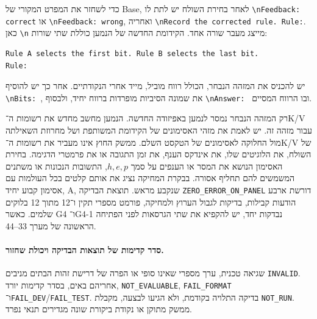 \documentclass[11pt,a4paper]{article}
\DeclareRobustCommand{\textenglish}[1]{\foreignlanguage{english}{#1}}
\newenvironment{english}{\begin{otherlanguage}{english}}{\end{otherlanguage}}
\theoremstyle{definition}
\begin{document}
כדי לשחזר את המפרט המקורי של \textenglish{Base}, לאחר בחירת השולח יש לתת לו \verb!\nFeedback: correct! או \verb!\nFeedback: wrong!, ואחריה \verb!\nRecord the corrected rule. Rule:!. כאן \verb!\n! מייצג מעבר שורה אחד. הקידומת החדשה של הנמען כוללת שתי שורות:
\begin{english}
\begin{verbatim}
Rule A selects the first bit. Rule B selects the last bit.
Rule:
\end{verbatim}
\end{english}
יש להכניס את המזהה הנבחר, הכולל רווח מוביל, מייד אחרי הנקודתיים. אחר כך יש להוסיף \verb!\nBits: !, את שמונה הסיביות מופרדות ברווח יחיד, ולבסוף \verb!\nAnswer: ! ובו הרווח המסיים.

רק המזהה הנבחר נמסר לנמען באפיזודה החדשה. הנמען מחשב מחדש את רשומות ה־\textenglish{K/V} עבור מזהה זה. יש לאמת את מזהי האסימונים של הקידומת המשותפת ושל מחרוזת השאילתה מול החלוקה לאסימונים של הטקסט השלם. ממשק החוץ אינו מעביר את רשומות ה־\textenglish{K/V} של השולח, את הלוגיטים שלו, את אינדקס הענף, את זמן התגובה או את פרמטרי הדגימה. בחירת האסימון הנושא את המסר או הענפים על סמך $h,e,p$, התשובות הנכונות או משתנים המשמשים להם תחליף אסורה. בבקרת המחיקה נציג את אותם קלטים בכל העולמות עם אסימון קבוע יחיד, \textenglish{A}, שנקבע מראש. תוצאת הבדיקה \textenglish{\texttt{ZERO\_ERROR\_ON\_PANEL}} דורשת ארבע הודעות קבילות, בדיקות לגבול הערוץ ולמחיקה, פורמט מספרי תקין ו־12 מתוך 12 בלוקים שלמים. כאשר \textenglish{G4} ו־\textenglish{G4-1} נבדקות יחד, יש להקפיא את שתי הגרסאות לפני הפתיחה הראשונה של מערך \textenglish{33--44}.

\paragraph{סדר קדימות של תוצאות הבדיקה ויכולת שחזור.}
שגיאה טכנית, ערך מספרי שאינו סופי או הפרה של דרישת זהות הבתים מניבים \textenglish{\texttt{INVALID}}. אחריהם באים, בסדר קדימות יורד, \textenglish{\texttt{NOT\_EVALUABLE}}, \textenglish{\texttt{FAIL\_FORMAT}} ו־\textenglish{\texttt{FAIL\_DEV}/\texttt{FAIL\_TEST}}. בדיקה התלויה בקודמת, ולא הגיעו לבצעה, מקבלת \textenglish{\texttt{NOT\_RUN}}. ממשק מתוקן או נקודת ביקורת שונה מגדירים תנאי נפרד.
\end{document}
